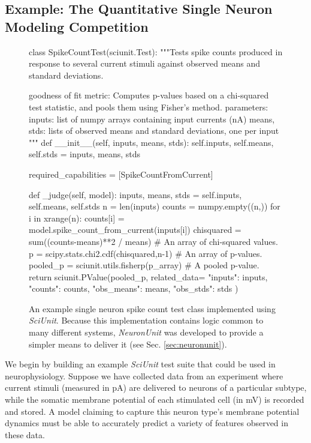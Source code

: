 \documentclass{frontiersSCNS}
\begin{document}
\subsection{Example: The Quantitative Single Neuron Modeling Competition}
\begin{figure}
\small
\begin{python}
class SpikeCountTest(sciunit.Test):
  """Tests spike counts produced in response to several current stimuli against observed means and standard deviations. 

  goodness of fit metric: Computes p-values based on a chi-squared test statistic, and pools them using Fisher's method.
  parameters:
    inputs: list of numpy arrays containing input currents (nA)
    means, stds: lists of observed means and standard deviations, one per input
  """
  def __init__(self, inputs, means, stds):
    self.inputs, self.means, self.stds = inputs, means, stds
	
  required_capabilities = [SpikeCountFromCurrent]
	
  def _judge(self, model):
    inputs, means, stds = self.inputs, self.means, self.stds
    n = len(inputs)
    counts = numpy.empty((n,))
    for i in xrange(n):
      counts[i] = model.spike_count_from_current(inputs[i])
    chisquared = sum((counts-means)**2 / means) # An array of chi-squared values.  
    p = scipy.stats.chi2.cdf(chisquared,n-1) # An array of p-values.  
    pooled_p = sciunit.utils.fisherp(p_array) # A pooled p-value.  
    return sciunit.PValue(pooled_p, related_data={
      "inputs": inputs, "counts": counts, "obs_means": means, "obs_stds": stds
    })
\end{python}
\vspace{-15px}
\caption{An example single neuron spike count test class implemented using \textit{SciUnit}. Because this implementation contains logic common to many different systems, \textit{NeuronUnit} was developed to provide a simpler means to deliver it (see Sec. \ref{sec:neuronunit}).}
\label{fig:rate_test}
\vspace{-10px}
\end{figure}

We begin by building an example \textit{SciUnit} test suite that could be used in neurophysiology. 
Suppose we have collected data from an experiment where current stimuli (measured in pA) are delivered to neurons of a particular subtype, while the somatic membrane potential of each stimulated cell (in mV) is recorded and stored.  
A model claiming to capture this neuron type's membrane potential dynamics must be able to accurately predict a variety of features observed in these data.
\end{document}
